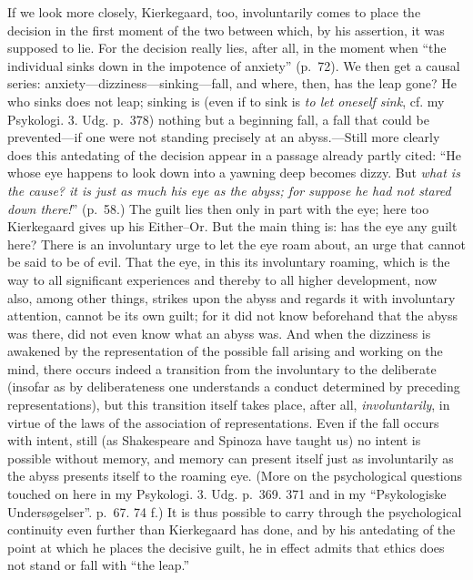 \documentclass[12pt,a4paper]{book}
\newcommand{\opage}[1]{\marginnote{\footnotesize\textit{[#1]}}}
\begin{document}
If we look more closely, Kierkegaard, too, involuntarily comes to place
the decision in the first moment of the two between which, by his
assertion, it was supposed to lie. For the decision really lies, after
all, in the moment when ``the individual sinks down in the impotence of
anxiety'' (p.~72). We then get a causal
series: anxiety---dizziness---sinking---fall, and where, then, has the
leap gone? He who sinks does not leap; sinking is (even if to sink is
\textit{to let oneself sink}, cf. my Psykologi. 3. Udg. p.~378) nothing
but a beginning fall, a fall that could be prevented---if one were not
standing precisely at an abyss.---Still more clearly does this
antedating of the decision appear in a passage already partly cited:
``He whose eye happens to look down into a yawning deep becomes dizzy.
But \textit{what is the cause? it is just as much his eye as the abyss;
for suppose he had not stared down there!}'' (p.~58.) The guilt lies
\opage{81}then only in part with the eye; here too Kierkegaard gives up his
Either--Or. But the main thing is: has the eye any guilt here? There is
an involuntary urge to let the eye roam about, an urge that cannot be
said to be of evil. That the eye, in this its involuntary roaming, which
is the way to all significant experiences and thereby to all higher
development, now also, among other things, strikes upon the abyss and
regards it with involuntary attention, cannot be its own guilt; for it
did not know beforehand that the abyss was there, did not even know what
an abyss was. And when the dizziness is awakened by the representation of
the possible fall arising and working on the mind, there occurs indeed a
transition from the involuntary to the deliberate (insofar as by
deliberateness one understands a conduct determined by preceding
representations), but this transition itself takes place, after all,
\textit{involuntarily}, in virtue of the laws of the association of
representations. Even if the fall occurs with intent, still (as
Shakespeare and Spinoza have taught us) no intent is possible without
memory, and memory can present itself just as involuntarily as the abyss
presents itself to the roaming eye.
(More on the psychological questions touched on here in my Psykologi. 3.
Udg. p.~369. 371 and in my ``Psykologiske Undersøgelser''. p.~67. 74 f.)
It is thus possible to carry through the psychological continuity even
further than Kierkegaard has done, and by his antedating of the point at
which he places the decisive guilt, he in effect admits that ethics does
not stand or fall with ``the leap.''
\end{document}
